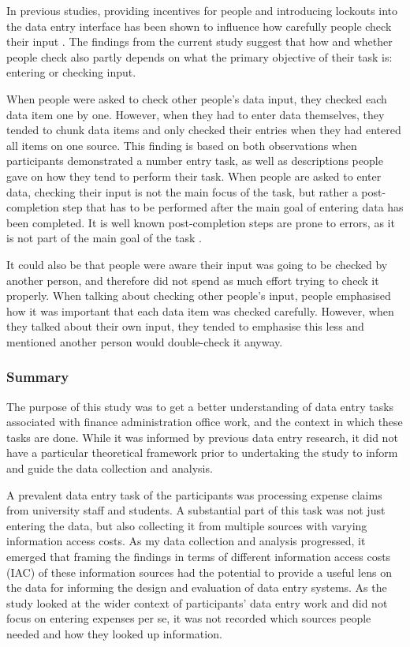 In previous studies, providing incentives for people and introducing lockouts into the data entry interface has been shown to influence how carefully people check their input \citep{Li2015, Gould2015}. The findings from the current study suggest that how and whether people check also partly depends on what the primary objective of their task is: entering or checking input.

When people were asked to check other people's data input, they checked each data item one by one. However, when they had to enter data themselves, they tended to chunk data items and only checked their entries when they had entered all items on one source. This finding is based on both observations when participants demonstrated a number entry task, as well as descriptions people gave on how they tend to perform their task. When people are asked to enter data, checking their input is not the main focus of the task, but rather a post-completion step that has to be performed after the main goal of entering data has been completed. It is well known post-completion steps are prone to errors, as it is not part of the main goal of the task \citep[e.g.][]{Byrne1995, Li2006, Li2008}.

It could also be that people were aware their input was going to be checked by another person, and therefore did not spend as much effort trying to check it properly. When talking about checking other people's input, people emphasised how it was important that each data item was checked carefully. However, when they talked about their own input, they tended to emphasise this less and mentioned another person would double-check it anyway.

\subsubsection{Summary}
The purpose of this study was to get a better understanding of data entry tasks associated with finance administration office work, and the context in which these tasks are done. While it was informed by previous data entry research, it did not have a particular theoretical framework prior to undertaking the study to inform and guide the data collection and analysis. 

A prevalent data entry task of the participants was processing expense claims from university staff and students. A substantial part of this task was not just entering the data, but also collecting it from multiple sources with varying information access costs. As my data collection and analysis progressed, it emerged that framing the findings in terms of different information access costs (IAC) of these information sources had the potential to provide a useful lens on the data for informing the design and evaluation of data entry systems. As the study looked at the wider context of participants' data entry work and did not focus on entering expenses per se, it was not recorded which sources people needed and how they looked up information.


